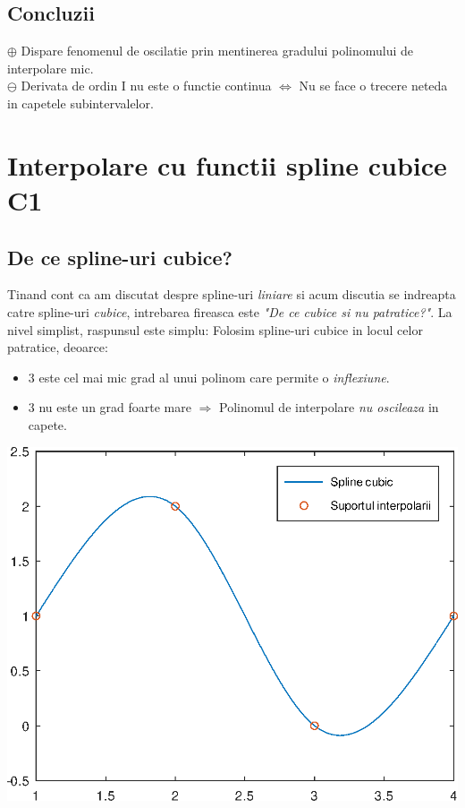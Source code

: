 \documentclass{article}
\begin{document}
\subsection{Concluzii}
\tab
$\oplus$ Dispare fenomenul de oscilatie prin mentinerea gradului polinomului de interpolare mic.\\

$\ominus$ Derivata de ordin I nu este o functie continua $\iff$ Nu se face o trecere neteda in capetele subintervalelor.\\


\section{Interpolare cu functii spline cubice C1}
\label{sec:spline_c1}

\subsection{De ce spline-uri cubice?}

\begin{minipage}{0.75\textwidth}
    \tabto{0.5cm} Tinand cont ca am discutat despre spline-uri \textit{liniare} si acum discutia se indreapta catre spline-uri \textit{cubice}, intrebarea fireasca este \textit{"De ce cubice si nu patratice?"}. La nivel simplist, raspunsul este simplu: Folosim spline-uri cubice in locul celor patratice, deoarce:
    \begin{itemize}
        \item $3$ este cel mai mic grad al unui polinom care permite o \textit{inflexiune}.
        \item $3$ nu este un grad foarte mare $\Rightarrow$ Polinomul de interpolare \textit{nu oscileaza} in capete.
    \end{itemize}
\end{minipage}
\hspace{0.75cm}\begin{minipage}{0.25\textwidth}
    \includegraphics[width=1.25\textwidth]{cubic_ex}
\end{minipage}
\end{document}
